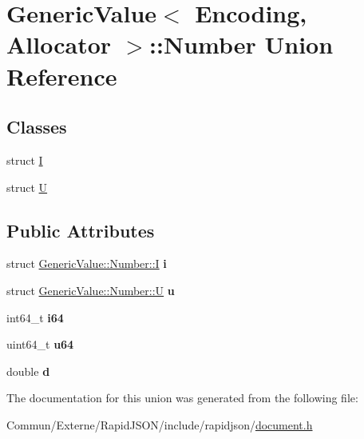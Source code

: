 \hypertarget{union_generic_value_1_1_number}{}\section{Generic\+Value$<$ Encoding, Allocator $>$\+:\+:Number Union Reference}
\label{union_generic_value_1_1_number}
\subsection*{Classes}
\begin{DoxyCompactItemize}
\item 
struct \hyperlink{struct_generic_value_1_1_number_1_1_i}{I}
\item 
struct \hyperlink{struct_generic_value_1_1_number_1_1_u}{U}
\end{DoxyCompactItemize}
\subsection*{Public Attributes}
\begin{DoxyCompactItemize}
\item 
struct \hyperlink{struct_generic_value_1_1_number_1_1_i}{Generic\+Value\+::\+Number\+::I} {\bfseries i}\hypertarget{union_generic_value_1_1_number_a0593fffc72a240979606668179e94436}{}\label{union_generic_value_1_1_number_a0593fffc72a240979606668179e94436}

\item 
struct \hyperlink{struct_generic_value_1_1_number_1_1_u}{Generic\+Value\+::\+Number\+::U} {\bfseries u}\hypertarget{union_generic_value_1_1_number_a3b5f0986718c830b88d641491248131d}{}\label{union_generic_value_1_1_number_a3b5f0986718c830b88d641491248131d}

\item 
int64\+\_\+t {\bfseries i64}\hypertarget{union_generic_value_1_1_number_ae53d96a8ead92099541da3b71633b77b}{}\label{union_generic_value_1_1_number_ae53d96a8ead92099541da3b71633b77b}

\item 
uint64\+\_\+t {\bfseries u64}\hypertarget{union_generic_value_1_1_number_a1c8d3c6d226cf74315e233b30b622430}{}\label{union_generic_value_1_1_number_a1c8d3c6d226cf74315e233b30b622430}

\item 
double {\bfseries d}\hypertarget{union_generic_value_1_1_number_a7ca3ad492fff303586d241eb0d17c242}{}\label{union_generic_value_1_1_number_a7ca3ad492fff303586d241eb0d17c242}

\end{DoxyCompactItemize}


The documentation for this union was generated from the following file\+:\begin{DoxyCompactItemize}
\item 
Commun/\+Externe/\+Rapid\+J\+S\+O\+N/include/rapidjson/\hyperlink{document_8h}{document.\+h}\end{DoxyCompactItemize}
